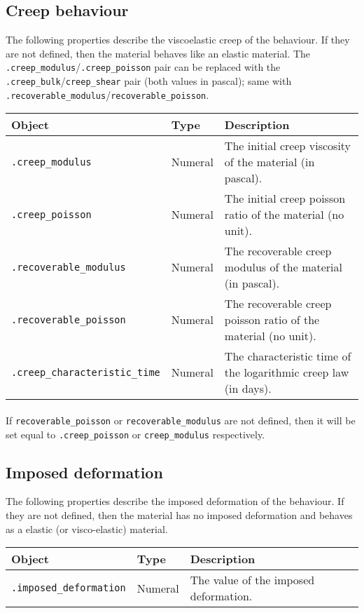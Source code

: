 \documentclass[10pt]{article}
\begin{document}
\subsection{Creep behaviour}

The following properties describe the viscoelastic creep of the behaviour. If they are not defined, then the material behaves like an elastic material. The \verb+.creep_modulus+/\verb+.creep_poisson+ pair can be replaced with the \verb+.creep_bulk+/\verb+creep_shear+ pair (both values in pascal); same with \verb+.recoverable_modulus+/\verb+recoverable_poisson+.\\

\begin{tabularx}{\textwidth}{llX}
\hline 
Object & Type & Description \\ 
\hline 
\verb+.creep_modulus+ & Numeral & The initial creep viscosity of the material (in pascal).\\
\verb+.creep_poisson+ & Numeral & The initial creep poisson ratio of the material (no unit).\\
\verb+.recoverable_modulus+ & Numeral & The recoverable creep modulus of the material (in pascal).\\
\verb+.recoverable_poisson+ & Numeral & The recoverable creep poisson ratio of the material (no unit).\\
\verb+.creep_characteristic_time+ & Numeral & The characteristic time of the logarithmic creep law (in days).\\
\hline 
\end{tabularx}

\paragraph{} If \verb+recoverable_poisson+ or \verb+recoverable_modulus+ are not defined, then it will be set equal to \verb+.creep_poisson+ or \verb+creep_modulus+ respectively.

\subsection{Imposed deformation}

The following properties describe the imposed deformation of the behaviour. If they are not defined, then the material has no imposed deformation and behaves as a elastic (or visco-elastic) material.\\

\begin{tabularx}{\textwidth}{llX}
\hline 
Object & Type & Description \\ 
\hline 
\verb+.imposed_deformation+ & Numeral & The value of the imposed deformation.\\
\hline 
\end{tabularx}
\end{document}
